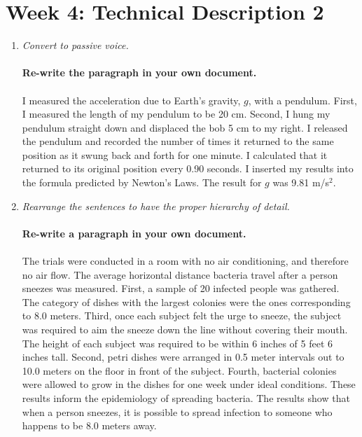 \documentclass{article}
\begin{document}
\section{Week 4: Technical Description 2}

\begin{enumerate}
\item \textit{Convert to passive voice.} \\ \\
\textbf{Re-write the paragraph in your own document.} \\ \\
I measured the acceleration due to Earth's gravity, $g$, with a pendulum.  First, I measured the length of my pendulum to be 20 cm.  Second, I hung my pendulum straight down and displaced the bob 5 cm to my right.  I released the pendulum and recorded the number of times it returned to the same position as it swung back and forth for one minute.  I calculated that it returned to its original position every 0.90 seconds.  I inserted my results into the formula predicted by Newton's Laws.  The result for $g$ was 9.81 m/s$^2$.
\item \textit{Rearrange the sentences to have the proper hierarchy of detail.} \\ \\
\textbf{Re-write a paragraph in your own document.} \\ \\
The trials were conducted in a room with no air conditioning, and therefore no air flow.  The average horizontal distance bacteria travel after a person sneezes was measured.  First, a sample of 20 infected people was gathered.  The category of dishes with the largest colonies were the ones corresponding to 8.0 meters.  Third, once each subject felt the urge to sneeze, the subject was required to aim the sneeze down the line without covering their mouth.  The height of each subject was required to be within 6 inches of 5 feet 6 inches tall.  Second, petri dishes were arranged in 0.5 meter intervals out to 10.0 meters on the floor in front of the subject.  Fourth, bacterial colonies were allowed to grow in the dishes for one week under ideal conditions.  These results inform the epidemiology of spreading bacteria. The results show that when a person sneezes, it is possible to spread infection to someone who happens to be 8.0 meters away.
\end{enumerate}
\end{document}
